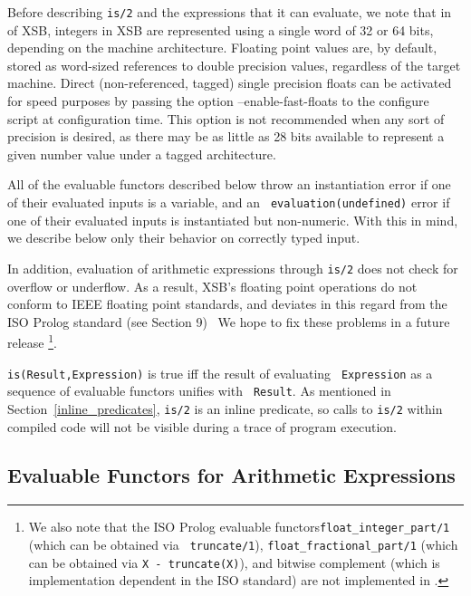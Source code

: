 Before describing {\tt is/2} and the expressions that it can evaluate,
we note that in \version{} of XSB, integers in XSB are represented
using a single word of 32 or 64 bits, depending on the machine
architecture. Floating point values are, by default, stored as
word-sized references to double precision values, regardless of the
target machine. Direct (non-referenced, tagged) single precision
floats can be activated for speed purposes by passing the option
--enable-fast-floats to the configure script at configuration time.
This option is not recommended when any sort of precision is desired,
as there may be as little as 28 bits available to represent a given
number value under a tagged architecture.  

All of the evaluable functors described below throw an instantiation
error if one of their evaluated inputs is a variable, and an {\tt
  evaluation(undefined)} error if one of their evaluated inputs is
instantiated but non-numeric.  With this in mind, we describe below
only their behavior on correctly typed input.

\compatability
In addition, evaluation of arithmetic expressions through {\tt is/2}
does not check for overflow or underflow.  As a result, XSB's floating
point operations do not conform to IEEE floating point standards, and
deviates in this regard from the ISO Prolog standard (see
\cite{ISO-Prolog} Section 9)~ We hope to fix these problems in a
future release \footnote{We also note that the ISO Prolog evaluable
  functors{\tt float\_integer\_part/1} (which can be obtained via {\tt
    truncate/1}), {\tt float\_fractional\_part/1} (which can be
  obtained via {\tt X - truncate(X)}), and bitwise complement (which
  is implementation dependent in the ISO standard) are not implemented
  in \version .}.

\begin{description}
{\tt is(Result,Expression)} is true iff the result of evaluating {\tt
Expression} as a sequence of evaluable functors unifies with {\tt
Result}.  As mentioned in Section~\ref{inline_predicates}, {\tt is/2}
is an inline predicate, so calls to {\tt is/2} within compiled code
will not be visible during a trace of program execution.
\end{description}

\subsection{Evaluable Functors for Arithmetic Expressions} \label{sec:arith-eval}

